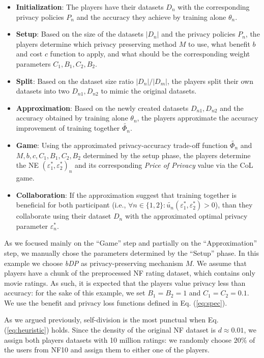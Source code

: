 \documentclass[USenglish,oneside,twocolumn]{article}
\theoremstyle{plain}
\begin{document}
    \begin{itemize}
        \item \textbf{Initialization}: The players have their datasets $D_n$ with the corresponding privacy policies $P_n$ and the accuracy they achieve by training alone $\theta_n$.
        \item \textbf{Setup}: Based on the size of the datasets $|D_n|$ and the privacy policies $P_n$, the players determine which privacy preserving method $M$ to use, what benefit $b$ and cost $c$ function to apply, and what should be the corresponding weight parameters $C_1,B_1,C_2,B_2$.
        \item \textbf{Split}: Based on the dataset size ratio $|D_n|/|D_m|$, the players split their own datasets into two $D_{n1},D_{n2}$ to mimic the original datasets. 
        \item \textbf{Approximation}: Based on the newly created datasets $D_{n1},D_{n2}$ and the accuracy obtained by training alone $\theta_n$, the players approximate the accuracy improvement of training together $\widetilde{\Phi_n}$.
        \item \textbf{Game}: Using the approximated privacy-accuracy trade-off function $\widetilde{\Phi_n}$ and $M,b,c,C_1,B_1,C_2,B_2$ determined by the setup phase, the players determine the NE $(\varepsilon_1^*,\varepsilon_2^*)_n$ and its corresponding \textit{Price of Privacy} value via the CoL game.
        \item \textbf{Collaboration}: If the approximation suggest that training together is beneficial for both participant (i.e., $\forall n\in\{1,2\}:\widetilde{u_n}(\varepsilon_1^*,\varepsilon_2^*)>0$), than they collaborate using their dataset $D_n$ with the approximated optimal privacy parameter $\varepsilon_n^*$.
    \end{itemize}
    \vspace{-0.25cm}
    
    As we focused mainly on the ``Game'' step and partially on the ``Approximation'' step, we manually chose the parameters determined by the ``Setup'' phase. In this example we choose \textit{bDP} as privacy-preserving mechanism $M$. We assume that players have a chunk of the preprocessed NF rating dataset, which contains only movie ratings. As such, it is expected that the players value privacy less than accuracy: for the sake of this example, we set $B_1=B_2=1$ and $C_1=C_2=0.1$. We use the benefit and privacy loss functions defined in Eq. (\ref{eq:spec}).
    
    As we argued previously, self-division is the most punctual when Eq. (\ref{eq:heuristic}) holds. Since the density of the original NF dataset is $d\approx0.01$, we assign both players datasets with 10 million ratings: we randomly choose $20\%$ of the users from NF10 and assign them to either one of the players.
    
\end{document}
